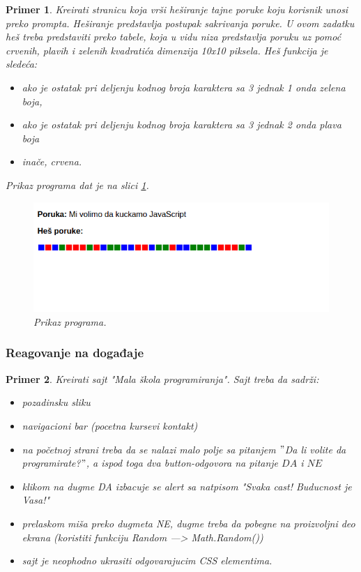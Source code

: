 \documentclass[a4paper]{article}
\newtheorem{primer}{Primer}[section]
\begin{document}
\begin{primer}
Kreirati stranicu koja vrši heširanje tajne poruke koju korisnik unosi preko prompta. Heširanje predstavlja postupak sakrivanja poruke. U ovom zadatku heš treba predstaviti preko tabele, koja u vidu niza predstavlja poruku uz pomoć crvenih, plavih i zelenih kvadratića dimenzija 10x10 piksela. Heš funkcija je sledeća:
\begin{itemize}
\item ako je ostatak pri deljenju kodnog broja karaktera sa 3 jednak 1 onda zelena boja,
\item ako je ostatak pri deljenju kodnog broja karaktera sa 3 jednak 2 onda plava boja
\item inače, crvena. 
\end{itemize}
Prikaz programa dat je na slici \ref{fig:hes}.
\begin{figure}[h!]
\begin{center}
\includegraphics[scale=0.5]{pictures/hes.png}
\end{center}
\caption{Prikaz programa.}
\label{fig:hes}
\end{figure}

\end{primer}

\subsubsection{Reagovanje na događaje}

\begin{primer}
Kreirati sajt "Mala škola programiranja". Sajt treba da sadrži:
\begin{itemize}
\item pozadinsku sliku
\item navigacioni bar (pocetna kursevi kontakt)
\item na početnoj strani treba da se nalazi malo polje sa pitanjem $"$Da li volite da
     programirate?$"$, a ispod toga dva button-odgovora na pitanje $DA$ i $NE$ 
\item klikom na dugme DA izbacuje se alert sa natpisom "Svaka cast! Buducnost je Vasa!"
\item prelaskom miša preko dugmeta NE, dugme treba da pobegne na proizvoljni deo ekrana
    (koristiti funkciju Random ---> Math.Random())
\item sajt je neophodno ukrasiti odgovarajucim CSS elementima. 
\end{itemize}
\end{primer}
\end{document}
